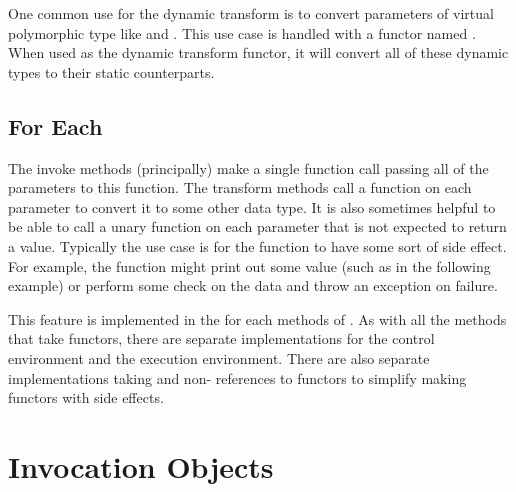 
One common use for the  dynamic transform
is to convert parameters of virtual polymorphic type like
 and . This
use case is handled with a functor named
. When used as the dynamic transform
functor, it will convert all of these dynamic types to their static
counterparts.



\subsection{For Each}
\label{sec:FunctionInterface:ForEach}


The invoke methods (principally) make a single function call passing all of
the parameters to this function. The transform methods call a function on
each parameter to convert it to some other data type. It is also sometimes
helpful to be able to call a unary function on each parameter that is not
expected to return a value. Typically the use case is for the function to
have some sort of side effect. For example, the function might print out
some value (such as in the following example) or perform some check on the
data and throw an exception on failure.

This feature is implemented in the for each methods of
.  As with all the
 methods that take functors, there are
separate implementations for the control environment and the execution
environment. There are also separate implementations taking
 and non- references to functors to
simplify making functors with side effects.





\section{Invocation Objects}
\label{sec:InvocationObjects}


